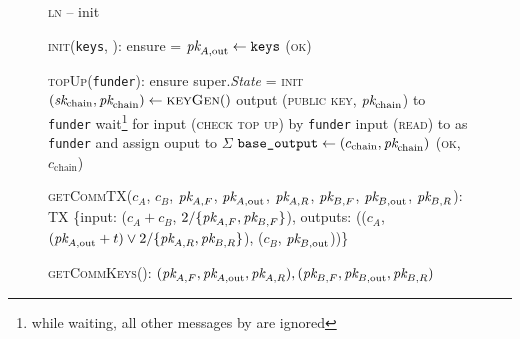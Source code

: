 \begin{figure}[H]
  \begin{processbox}{\textsc{ln} -- init}
    \begin{algorithmic}[1]
      \State \textsc{init}(\texttt{keys}, \dave):
      \Indent
        \State ensure \dave = \alice
        \State $\textit{pk}_{A, \mathrm{out}} \gets \texttt{keys}$
        \State \Return (\textsc{ok})
      \EndIndent
      \Statex

      \State \textsc{topUp}(\texttt{funder}):
      \Indent
        \State ensure super.\textit{State} = \textsc{init}
        \State $(\textit{sk}_{\mathrm{chain}}, \textit{pk}_{\mathrm{chain}}) \gets
        \textsc{keyGen}()$
        \State output (\textsc{public key}, $\textit{pk}_{\mathrm{chain}}$) to
        \texttt{funder}
          \State wait\footnote{while waiting, all other messages by \dave are
          ignored} for input (\textsc{check top up}) by \texttt{funder}
          \State input (\textsc{read}) to \ledger as \texttt{funder} and assign
          ouput to $\Sigma$
        \EndWhile
        \State $\texttt{base\_output} \gets (c_{\mathrm{chain}},
        \textit{pk}_{\mathrm{chain}})$
        \State \Return (\textsc{ok}, $c_{\mathrm{chain}}$)
      \EndIndent
      \Statex

      \State {}
      \State \textsc{getCommTX}($c_A$, $c_B$, $\textit{pk}_{A, F}$, $\textit{pk}_{A,
      \mathrm{out}}$, $\textit{pk}_{A, R}$, $\textit{pk}_{B, F}$, $\textit{pk}_{B, \mathrm{out}}$, $\textit{pk}_{B,
      R}$):
      \Indent
        \State \Return TX \{input: ($c_A + c_B$, $2/\{\textit{pk}_{A, F}, \textit{pk}_{B, F}\}$),
        outputs: (($c_A$, $(\textit{pk}_{A, \mathrm{out}} + t) \vee 2/\{\textit{pk}_{A, R}, \textit{pk}_{B,
        R}\}$), ($c_B$, $\textit{pk}_{B, \mathrm{out}}$))\}
      \EndIndent
      \Statex

      \State {}
      \State \textsc{getCommKeys}():
      \Indent
        \State \Return $(\textit{pk}_{A, F}, \textit{pk}_{A, \mathrm{out}}, \textit{pk}_{A, R}), (\textit{pk}_{B,
        F}, \textit{pk}_{B, \mathrm{out}}, \textit{pk}_{B, R})$
      \EndIndent
    \end{algorithmic}
  \end{processbox}
  \caption{}
  \label{code:ln:init}
\end{figure}

